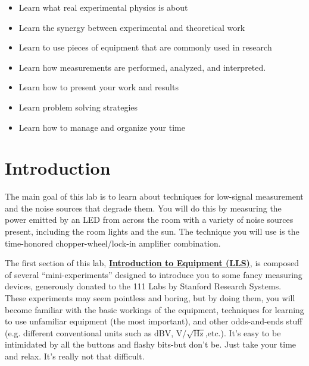 \documentclass{../lab}
\begin{document}
\begin{itemize}
    \item Learn what real experimental physics is about

    \item Learn the synergy between experimental and theoretical work

    \item Learn to use pieces of equipment that are commonly used in research

    \item Learn how measurements are performed, analyzed, and interpreted.

    \item Learn how to present your work and results

    \item Learn problem solving strategies

    \item Learn how to manage and organize your time

\end{itemize}

\section{Introduction}

The main goal of this lab is to learn about techniques for low-signal measurement and the noise sources that degrade them. You will do this by measuring the power emitted by an LED from across the room with a variety of noise sources present, including the room lights and the sun. The technique you will use is the time-honored chopper-wheel/lock-in amplifier combination.

The first section of this lab, \href{http://http://experimentationlab.berkeley.edu/IntroductiontoEquipment}{\textbf{Introduction to Equipment (LLS)}}, is composed of several ``mini-experiments'' designed to introduce you to some fancy measuring devices, generously donated to the 111 Labs by Stanford Research Systems. These experiments may seem pointless and boring, but by doing them, you will become familiar with the basic workings of the equipment, techniques for learning to use unfamiliar equipment (the most important), and other odds-and-ends stuff (e.g. different conventional units such as dBV, V/${\sqrt{\textrm{Hz}}}$,etc.). It's easy to be intimidated by all the buttons and flashy bits-but don't be. Just take your time and relax. It's really not that difficult.
\end{document}
